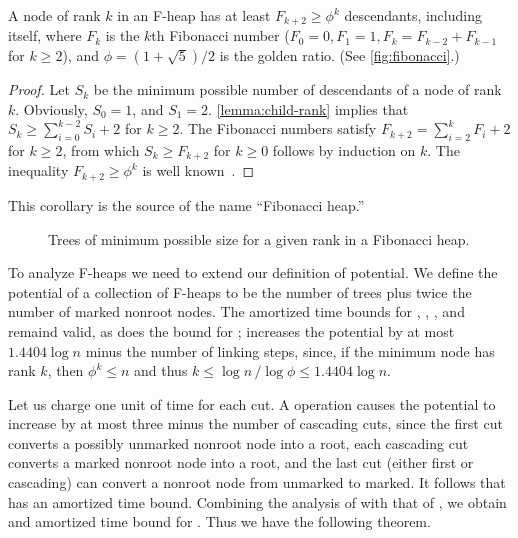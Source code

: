 \begin{corollary}
    \label{cor:golden-node}
    A node of rank \(k\) in an F-heap has at least \(F_{k+2} \geq \phi^k\)
    descendants, including itself, where \(F_k\) is the \(k\)th Fibonacci number
    (\(F_0 = 0, F_1 = 1, F_k = F_{k-2} + F_{k-1}\) for \(k \geq 2\)), and \(\phi = (1
    + \sqrt 5) / 2\) is the golden ratio. (See \autoref{fig:fibonacci}.)
\end{corollary}

\begin{proof}
    Let \(S_k\) be the minimum possible number of descendants of a node of rank
    \(k\). Obviously, \(S_0 = 1\), and \(S_1 = 2\). \autoref{lemma:child-rank}
    implies that \(S_k \geq \sum_{i=0}^{k-2} S_i + 2\) for \(k \geq 2\). The
    Fibonacci numbers satisfy \(F_{k+2} = \sum_{i=2}^k F_i + 2\) for \(k \geq 2\),
    from which \(S_k \geq F_{k+2}\) for \(k \geq 0\) follows by induction on \(k\).
    The inequality \(F_{k+2} \geq \phi^k\) is well known~\cite{TAOCP1}.
\end{proof}

\begin{remark}
    This corollary is the source of the name ``Fibonacci heap.''
\end{remark}

\begin{figure}
    \caption{Trees of minimum possible size for a given rank in a Fibonacci heap.}
    \label{fig:fibonacci}
\end{figure}

To analyze F-heaps we need to extend our definition of potential. We define the
potential of a collection of F-heaps  to be the number of trees plus twice the number
of marked nonroot nodes. The  amortized time bounds for ,
, , and  remaind valid, as does the  bound for ;  increases the potential by at
most \(1.4404 \log n\) minus the number of linking steps, since, if the minimum node
has rank \(k\), then \(\phi^k \leq n\) and thus \(k \leq \log n\,/\log \phi \leq
1.4404 \log n\).

Let us charge one unit of time for each cut. A  operation causes
the potential to increase by at most three minus the number of cascading cuts, since
the first cut converts a possibly unmarked nonroot node into a root, each cascading
cut converts a marked nonroot node into a root, and the last cut (either first or
cascading) can convert a nonroot node from unmarked to marked. It follows that
 has an  amortized time bound. Combining the analysis of
 with that of , we obtain and 
amortized time bound for . Thus we have the following theorem.

